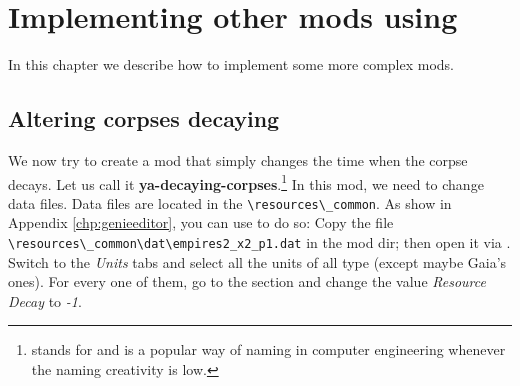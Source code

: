 \chapter{Implementing other mods using \genie{}}

In this chapter we describe how to implement some more complex mods.

\section{Altering corpses decaying}

We now try to create a mod that simply changes the time when the corpse decays. Let us call it \textbf{ya-decaying-corpses}.\footnote{ stands for  and is a popular way of naming in computer engineering whenever the naming creativity is low.} In this mod, we need to change data files. Data files are located in the \aoeexedir{}\verb|\resources\_common|. As show in Appendix \ref{chp:genieeditor}, you can use \genie{} to do so: Copy the file \aoeexedir{}\verb|\resources\_common\dat\empires2_x2_p1.dat| in the mod dir; then open it via \genie{}. Switch to the \textit{Units} tabs and select all the units of all type (except maybe Gaia's ones). For every one of them, go to the  section and change the value \textit{Resource Decay} to \textit{-1}.
